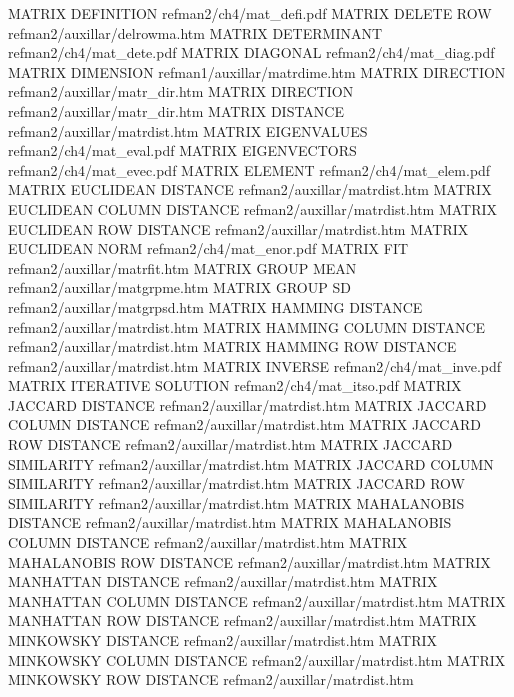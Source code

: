 MATRIX DEFINITION                       refman2/ch4/mat_defi.pdf
MATRIX DELETE ROW                       refman2/auxillar/delrowma.htm
MATRIX DETERMINANT                      refman2/ch4/mat_dete.pdf
MATRIX DIAGONAL                         refman2/ch4/mat_diag.pdf
MATRIX DIMENSION                        refman1/auxillar/matrdime.htm
MATRIX DIRECTION                        refman2/auxillar/matr_dir.htm
MATRIX DIRECTION                        refman2/auxillar/matr_dir.htm
MATRIX DISTANCE                         refman2/auxillar/matrdist.htm
MATRIX EIGENVALUES                      refman2/ch4/mat_eval.pdf
MATRIX EIGENVECTORS                     refman2/ch4/mat_evec.pdf
MATRIX ELEMENT                          refman2/ch4/mat_elem.pdf
MATRIX EUCLIDEAN DISTANCE               refman2/auxillar/matrdist.htm
MATRIX EUCLIDEAN COLUMN DISTANCE        refman2/auxillar/matrdist.htm
MATRIX EUCLIDEAN ROW DISTANCE           refman2/auxillar/matrdist.htm
MATRIX EUCLIDEAN NORM                   refman2/ch4/mat_enor.pdf
MATRIX FIT                              refman2/auxillar/matrfit.htm
MATRIX GROUP MEAN                       refman2/auxillar/matgrpme.htm
MATRIX GROUP SD                         refman2/auxillar/matgrpsd.htm
MATRIX HAMMING DISTANCE                 refman2/auxillar/matrdist.htm
MATRIX HAMMING COLUMN DISTANCE          refman2/auxillar/matrdist.htm
MATRIX HAMMING ROW DISTANCE             refman2/auxillar/matrdist.htm
MATRIX INVERSE                          refman2/ch4/mat_inve.pdf
MATRIX ITERATIVE SOLUTION               refman2/ch4/mat_itso.pdf
MATRIX JACCARD DISTANCE                 refman2/auxillar/matrdist.htm
MATRIX JACCARD COLUMN DISTANCE          refman2/auxillar/matrdist.htm
MATRIX JACCARD ROW DISTANCE             refman2/auxillar/matrdist.htm
MATRIX JACCARD SIMILARITY               refman2/auxillar/matrdist.htm
MATRIX JACCARD COLUMN SIMILARITY        refman2/auxillar/matrdist.htm
MATRIX JACCARD ROW SIMILARITY           refman2/auxillar/matrdist.htm
MATRIX MAHALANOBIS DISTANCE             refman2/auxillar/matrdist.htm
MATRIX MAHALANOBIS COLUMN DISTANCE      refman2/auxillar/matrdist.htm
MATRIX MAHALANOBIS ROW DISTANCE         refman2/auxillar/matrdist.htm
MATRIX MANHATTAN DISTANCE               refman2/auxillar/matrdist.htm
MATRIX MANHATTAN COLUMN DISTANCE        refman2/auxillar/matrdist.htm
MATRIX MANHATTAN ROW DISTANCE           refman2/auxillar/matrdist.htm
MATRIX MINKOWSKY DISTANCE               refman2/auxillar/matrdist.htm
MATRIX MINKOWSKY COLUMN DISTANCE        refman2/auxillar/matrdist.htm
MATRIX MINKOWSKY ROW DISTANCE           refman2/auxillar/matrdist.htm
